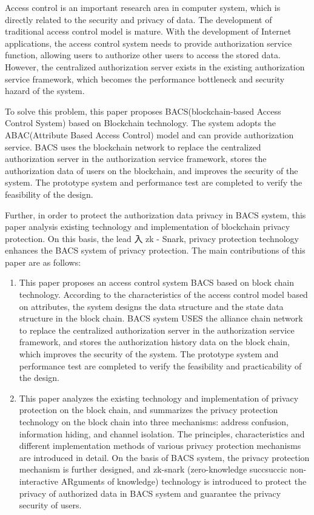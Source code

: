 \begin{abstract*}
  Access control is an important research area in computer system, which is directly related to the security and privacy of data. The development of traditional access control model is mature. With the development of Internet applications, the access control system needs to provide authorization service function, allowing users to authorize other users to access the stored data. However, the centralized authorization server exists in the existing authorization service framework, which becomes the performance bottleneck and security hazard of the system.

  To solve this problem, this paper proposes BACS(blockchain-based Access Control System) based on Blockchain technology. The system adopts the ABAC(Attribute Based Access Control) model and can provide authorization service. BACS uses the blockchain network to replace the centralized authorization server in the authorization service framework, stores the authorization data of users on the blockchain, and improves the security of the system. The prototype system and performance test are completed to verify the feasibility of the design.

  Further, in order to protect the authorization data privacy in BACS system, this paper analysis existing technology and implementation of blockchain privacy protection. On this basis, the lead ⼊ zk - Snark, privacy protection technology enhances the BACS system of privacy protection. The main contributions of this paper are as follows:

  \begin{enumerate}
    \item This paper proposes an access control system BACS based on block chain technology. According to the characteristics of the access control model based on attributes, the system designs the data structure and the state data structure in the block chain. BACS system USES the alliance chain network to replace the centralized authorization server in the authorization service framework, and stores the authorization history data on the block chain, which improves the security of the system. The prototype system and performance test are completed to verify the feasibility and practicability of the design.
    \item This paper analyzes the existing technology and implementation of privacy protection on the block chain, and summarizes the privacy protection technology on the block chain into three mechanisms: address confusion, information hiding, and channel isolation. The principles, characteristics and different implementation methods of various privacy protection mechanisms are introduced in detail. On the basis of BACS system, the privacy protection mechanism is further designed, and zk-snark (zero-knowledge succsuccic non-interactive ARguments of knowledge) technology is introduced to protect the privacy of authorized data in BACS system and guarantee the privacy security of users.
  \end{enumerate}

\end{abstract*}
